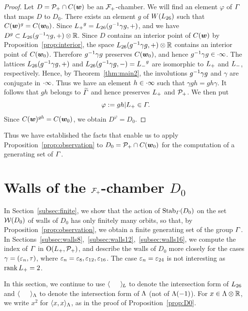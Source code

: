 \documentclass{amsart} %
\begin{document}
\begin{proof}
Let $D=\mathord{\mathcal{P}}_{+} \cap \mathord{C}(\boldsymbol{w})$ be an $\mathord{\mathcal{F}}_{+}$-chamber.
We will find an element $\varphi$ of $\varGamma$ 
that maps $D$ to $D_0$.
There exists an element $g$ of $W(L_{26})$
such that $\mathord{C}(\boldsymbol{w})^g=\mathord{C}(\boldsymbol{w}_0)$.
Since  ${L_{+}}^g=L_{26}(g^{-1} \gamma g, +)$, 
and we have $D^g\subset L_{26}(g^{-1} \gamma g, +)\otimes \mathord{\mathbb{R}}$.
Since $D$ contains an interior point of $\mathord{C}(\boldsymbol{w})$ by 
Proposition~\ref{prop:interior},
the space $L_{26}(g^{-1} \gamma g, +)\otimes \mathord{\mathbb{R}}$ contains an interior point of $\mathord{C}(\boldsymbol{w}_0)$.
Therefore $g^{-1} \gamma g$ preserves $\mathord{C}(\boldsymbol{w}_0)$,
and hence $g^{-1} \gamma g \in \cdot \infty$.
The lattices $L_{26}(g^{-1} \gamma g, + )$ and $L_{26}(g^{-1} \gamma g, -)={L_{-}}^g$
are isomorphic to $L_{+}$ and $L_{-}$, respectively.
Hence, by Theorem~\ref{thm:main2},
the involutions $g^{-1} \gamma g$ and $\gamma$ are conjugate in $\cdot \infty$.
Thus we have an element $h\in \cdot \infty$
such that $\gamma g h =gh\gamma $.
It follows that $gh$ belongs to $\widetilde{\varGamma}$ and hence preserves $L_{+}$ and $\mathord{\mathcal{P}}_{+}$.
We then put
\[
\varphi:=gh|L_{+}\in \varGamma.
\]
Since $\mathord{C}(\boldsymbol{w})^{gh}=\mathord{C}(\boldsymbol{w}_0)$,
we obtain  $D^\varphi=D_0$.
\end{proof}
%
%
Thus we have established the facts that enable us 
to apply Proposition~\ref{prop:observation}
to $D_0=\mathord{\mathcal{P}}_{+}\cap \mathord{C}(\boldsymbol{w}_0)$ 
for the computation of a generating set of
$\varGamma$.
%
%
\section{Walls of the $\mathord{\mathcal{F}}_{+}$-chamber $D_0$}\label{sec:wallsD0}
%
In Section~\ref{subsec:finite},
we show that 
the action of $\operatorname{Stab}_{\varGamma}(D_0)$ on the set $\mathord{\mathcal{W}}(D_0)$ of 
walls of $D_0$ has only finitely many orbits,
so that, by Proposition~\ref{prop:observation},
we obtain a finite generating set of the group $\varGamma$.
In Sections~\ref{subsec:walls8},~\ref{subsec:walls12},~\ref{subsec:walls16}, 
we compute the index of $\varGamma$ in
$\mathord{\mathrm{O}}(L_{+}, \mathord{\mathcal{P}}_{+})$,
and describe the walls of $D_0$ more closely
for the cases $\gamma=(\varepsilon_n, \tau)$,
where $\varepsilon_n=\varepsilon_8, \varepsilon_{12}, \varepsilon_{16}$.
The case $\varepsilon_n=\varepsilon_{24}$ is not interesting as $\operatorname{rank} L_{+}=2$.
%
\par
In this section,
we continue to use
$\langle \phantom{a, a} \rangle_{\hskip -1pt L}$ to denote the intersection form of $L_{26}$
and $\langle \phantom{a, a} \rangle_{\Lambda}$ to denote the intersection form of $\Lambda$
(not of $\Lambda(-1)$).
For $x\in \Lambda\otimes\mathord{\mathbb{R}}$, we write $x^2$ for $\langle x,x \rangle_{\Lambda}$,
as in the proof of Proposition~\ref{prop:D0}.
%
\end{document}
